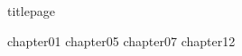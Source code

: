 \documentclass[
	,a4paper
	,12pt
	,oneside
]{book}
\begin{document}
\frontmatter
	{titlepage}
	\restoregeometry
	\tableofcontents

\mainmatter

	{chapter01}
	{chapter05}
	{chapter07}
	{chapter12}
	

\backmatter
\end{document}
